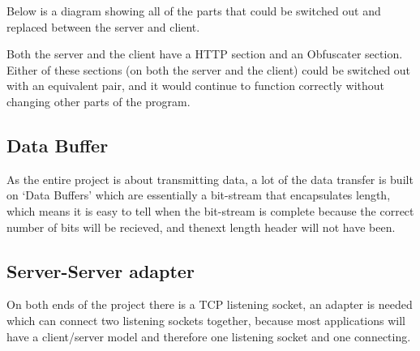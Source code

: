 Below is a diagram showing all of the parts that could be switched out and replaced between the server and client.
\begin{center}
\end{center}
Both the server and the client have a HTTP section and an Obfuscater section.
Either of these sections (on both the server and the client) could be switched out with an equivalent pair, and it would continue to function correctly without changing other parts of the program.

\subsection{Data Buffer}
As the entire project is about transmitting data, a lot of the data transfer is built on `Data Buffers' which are essentially a bit-stream that encapsulates length, which means it is easy to tell when the bit-stream is complete because the correct number of bits will be recieved, and thenext length header will not have been.

\subsection{Server-Server adapter}
On both ends of the project there is a TCP listening socket, an adapter is needed which can connect two listening sockets together, because most applications will have a client/server model and therefore one listening socket and one connecting.
